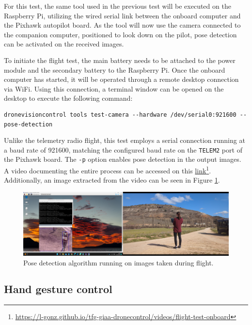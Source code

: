 For this test, the same tool used in the previous test will be executed on the Raspberry Pi, utilizing the wired serial link between the onboard computer and the Pixhawk autopilot board. As the tool will now use the camera connected to the companion computer, positioned to look down on the pilot, pose detection can be activated on the received images.


To initiate the flight test, the main battery needs to be attached to the power module and the secondary battery to the Raspberry Pi. Once the onboard computer has started, it will be operated through a remote desktop connection via WiFi. Using this connection, a terminal window can be opened on the desktop to execute the following command:
\begin{verbatim}
dronevisioncontrol tools test-camera --hardware /dev/serial0:921600 --pose-detection
\end{verbatim}


Unlike the telemetry radio flight, this test employs a serial connection running at a baud rate of 921600, matching the configured baud rate on the \texttt{TELEM2} port of the Pixhawk board. The \texttt{-p} option enables pose detection in the output images. A video documenting the entire process can be accessed on this \href{https://l-gonz.github.io/tfg-giaa-dronecontrol/videos/flight-test-onboard}{link}\footnote{\url{https://l-gonz.github.io/tfg-giaa-dronecontrol/videos/flight-test-onboard}}. Additionally, an image extracted from the video can be seen in Figure \ref{fig:flight-test-cam-onboard}.


\begin{figure}
  \centering
  \includegraphics[width=\textwidth, keepaspectratio]{img/video-field-test-onboard.png}
  \caption{Pose detection algorithm running on images taken during flight.}
  \label{fig:flight-test-cam-onboard}
\end{figure}


\subsection{Hand gesture control}
\label{subsec:fl-test-4}


